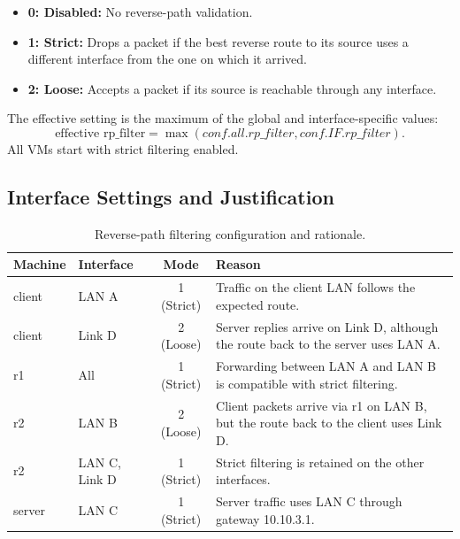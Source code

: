 \documentclass[12pt]{article}
\begin{document}
\begin{itemize}
    \item \textbf{0: Disabled:} No reverse-path validation.
    \item \textbf{1: Strict:} Drops a packet if the best reverse route to its source uses a different interface from the one on which it arrived.
    \item \textbf{2: Loose:} Accepts a packet if its source is reachable through any interface.
\end{itemize}

The effective setting is the maximum of the global and interface-specific values:
\[
\text{effective rp\_filter}
= \max(conf.all.rp\_filter,
       conf.IF.rp\_filter).
\]
All VMs start with strict filtering enabled.

\subsection{Interface Settings and Justification}

\begin{table}[H]
    \centering
    \renewcommand{\arraystretch}{1.15}
    \begin{tabularx}{\textwidth}{@{} l l c X @{}}
        \toprule
        \textbf{Machine} & \textbf{Interface} & \textbf{Mode} &
        \textbf{Reason} \\
        \midrule
        client & LAN A & 1 (Strict) &
        Traffic on the client LAN follows the expected route. \\
        client & Link D & 2 (Loose) &
        Server replies arrive on Link D, although the route back to the server uses LAN A. \\
        r1 & All & 1 (Strict) &
        Forwarding between LAN A and LAN B is compatible with strict filtering. \\
        r2 & LAN B & 2 (Loose) &
        Client packets arrive via r1 on LAN B, but the route back to the client uses Link D. \\
        r2 & LAN C, Link D & 1 (Strict) &
        Strict filtering is retained on the other interfaces. \\
        server & LAN C & 1 (Strict) &
        Server traffic uses LAN C through gateway 10.10.3.1. \\
        \bottomrule
    \end{tabularx}
    \caption{Reverse-path filtering configuration and rationale.}
    \label{tab:rp_filter_table}
\end{table}
\end{document}
